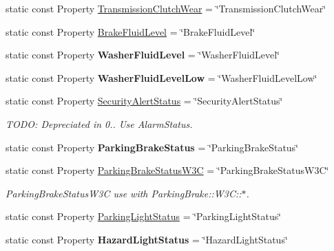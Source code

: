 \begin{DoxyCompactItemize}
\item 
static const Property \hyperlink{classVehicleProperty_a4abb5cb7193d2836c49962c34f8ddc0f}{Transmission\+Clutch\+Wear} = \char`\"{}Transmission\+Clutch\+Wear\char`\"{}
\item 
static const Property \hyperlink{classVehicleProperty_a83bc635222e9ba14dfa134defa21e825}{Brake\+Fluid\+Level} = \char`\"{}Brake\+Fluid\+Level\char`\"{}
\item 
\hypertarget{classVehicleProperty_a37c8c7e827625705d2f560ab53ee8d23}{static const Property {\bfseries Washer\+Fluid\+Level} = \char`\"{}Washer\+Fluid\+Level\char`\"{}}\label{classVehicleProperty_a37c8c7e827625705d2f560ab53ee8d23}

\item 
\hypertarget{classVehicleProperty_ac283948630acd3f5629d7358a00ce44c}{static const Property {\bfseries Washer\+Fluid\+Level\+Low} = \char`\"{}Washer\+Fluid\+Level\+Low\char`\"{}}\label{classVehicleProperty_ac283948630acd3f5629d7358a00ce44c}

\item 
static const Property \hyperlink{classVehicleProperty_a7bc28af663879a2ac9145e5b97a5da4f}{Security\+Alert\+Status} = \char`\"{}Security\+Alert\+Status\char`\"{}
\begin{DoxyCompactList}\small\item\em T\+O\+D\+O\+: Depreciated in 0.. Use Alarm\+Status. \end{DoxyCompactList}\item 
\hypertarget{classVehicleProperty_a848ad7334c7aa14709fe2e8c3a1b2608}{static const Property {\bfseries Parking\+Brake\+Status} = \char`\"{}Parking\+Brake\+Status\char`\"{}}\label{classVehicleProperty_a848ad7334c7aa14709fe2e8c3a1b2608}

\item 
static const Property \hyperlink{classVehicleProperty_a7a0b961463207e9cb2f57e7c1061f7ae}{Parking\+Brake\+Status\+W3\+C} = \char`\"{}Parking\+Brake\+Status\+W3\+C\char`\"{}
\begin{DoxyCompactList}\small\item\em Parking\+Brake\+Status\+W3\+C use with Parking\+Brake\+::\+W3\+C\+:\+:$\ast$. \end{DoxyCompactList}\item 
static const Property \hyperlink{classVehicleProperty_a505ffc37974f674df55a97c27a7ba0b7}{Parking\+Light\+Status} = \char`\"{}Parking\+Light\+Status\char`\"{}
\item 
\hypertarget{classVehicleProperty_a21058071101327c72251e2e09e24cb67}{static const Property {\bfseries Hazard\+Light\+Status} = \char`\"{}Hazard\+Light\+Status\char`\"{}}\label{classVehicleProperty_a21058071101327c72251e2e09e24cb67}


\end{DoxyCompactItemize}
